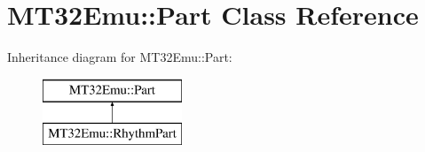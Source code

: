 \hypertarget{classMT32Emu_1_1Part}{\section{M\-T32\-Emu\-:\-:Part Class Reference}
\label{classMT32Emu_1_1Part}
}
Inheritance diagram for M\-T32\-Emu\-:\-:Part\-:\begin{figure}[H]
\begin{center}
\leavevmode
\includegraphics[height=2.000000cm]{classMT32Emu_1_1Part}
\end{center}
\end{figure}
